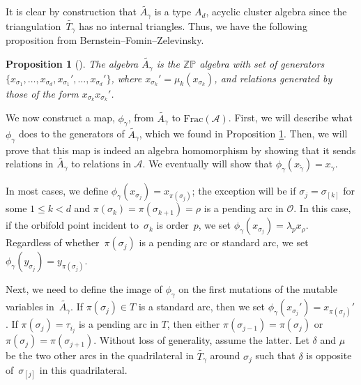 \documentclass[pdftex]{sigma}%
\numberwithin{equation}{section}
\newtheorem{Proposition}[Theorem]{Proposition}
\begin{document}
It is clear by construction that $\widetilde{A_\gamma}$ is a type $A_d$, acyclic cluster algebra since the triangulation~$\widetilde{T_\gamma}$ has no internal triangles. Thus, we have the following proposition from Bernstein--Fomin--Zelevinsky.

\begin{Proposition}[{\cite[Corollary~1.21]{BFZ}}] \label{prop:Agamma}The algebra $\widetilde{A_\gamma}$ is the $\mathbb{ZP}$ algebra with set of generators $\{x_{\sigma_1}, \ldots, x_{\sigma_d}, x_{\sigma_1}', \ldots, x_{\sigma_d}'\}$, where $x_{\sigma_k}' = \mu_k(x_{\sigma_k})$, and relations generated by those of the form $x_{\sigma_k}x_{\sigma_k}'$.
\end{Proposition}

We now construct a map, $\phi_\gamma$, from $\widetilde{A_\gamma}$ to $\text{Frac}(\mathcal{A})$. First, we will describe what $\phi_\gamma$ does to the generators of $\widetilde{A_\gamma}$, which we found in Proposition \ref{prop:Agamma}. Then, we will prove that this map is indeed an algebra homomorphism by showing that it sends relations in $\widetilde{A_\gamma}$ to relations in $\mathcal{A}$. We eventually will show that $\phi_\gamma(x_{\widetilde{\gamma}}) = x_\gamma$.

In most cases, we define $\phi_\gamma(x_{\sigma_j}) = x_{\pi(\sigma_j)}$; the exception will be if $\sigma_j = \sigma_{[k]}$ for some $1 \leq k < d$ and $\pi(\sigma_k) = \pi(\sigma_{k+1}) = \rho$ is a pending arc in $\mathcal{O}$. In this case, if the orbifold point incident to~$\sigma_k$ is order~$p$, we set $\phi_\gamma(x_{\sigma_j}) = \lambda_p x_\rho$.
Regardless of whether~$\pi(\sigma_j)$ is a pending arc or standard arc, we set $\phi_\gamma(y_{\sigma_j}) = y_{\pi(\sigma_j)}$.

Next, we need to define the image of $\phi_\gamma$ on the first mutations of the mutable variables in~$\widetilde{A_\gamma}$. If $\pi(\sigma_j) \in T$ is a standard arc, then we set $\phi_\gamma(x_{\sigma_j}') = x_{\pi(\sigma_j)}'$. If $\pi(\sigma_j) = \tau_{i_j}$ is a pending arc in $T$, then either $\pi(\sigma_{j-1}) = \pi(\sigma_j)$ or $\pi(\sigma_{j}) = \pi(\sigma_{j+1})$. Without loss of generality, assume the latter. Let $\delta$ and $\mu$ be the two other arcs in the quadrilateral in $\widetilde{T_\gamma}$ around $\sigma_j$ such that $\delta$ is opposite of~$\sigma_{[j]}$ in this quadrilateral.
\end{document}
